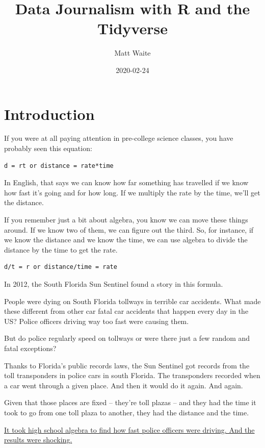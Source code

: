 \documentclass[]{book}
\title{Data Journalism with R and the Tidyverse}
\author{Matt Waite}
\date{2020-02-24}
\begin{document}
\maketitle

{
\setcounter{tocdepth}{1}
\tableofcontents
}
\hypertarget{introduction}{%
\chapter{Introduction}\label{introduction}}

If you were at all paying attention in pre-college science classes, you have probably seen this equation:

\begin{verbatim}
d = rt or distance = rate*time
\end{verbatim}

In English, that says we can know how far something has travelled if we know how fast it's going and for how long. If we multiply the rate by the time, we'll get the distance.

If you remember just a bit about algebra, you know we can move these things around. If we know two of them, we can figure out the third. So, for instance, if we know the distance and we know the time, we can use algebra to divide the distance by the time to get the rate.

\begin{verbatim}
d/t = r or distance/time = rate
\end{verbatim}

In 2012, the South Florida Sun Sentinel found a story in this formula.

People were dying on South Florida tollways in terrible car accidents. What made these different from other car fatal car accidents that happen every day in the US? Police officers driving way too fast were causing them.

But do police regularly speed on tollways or were there just a few random and fatal exceptions?

Thanks to Florida's public records laws, the Sun Sentinel got records from the toll transponders in police cars in south Florida. The transponders recorded when a car went through a given place. And then it would do it again. And again.

Given that those places are fixed -- they're toll plazas -- and they had the time it took to go from one toll plaza to another, they had the distance and the time.

\href{http://www.sun-sentinel.com/news/local/speeding-cops/fl-speeding-cops-20120211,0,3706919.story}{It took high school algebra to find how fast police officers were driving. And the results were shocking.}
\end{document}
